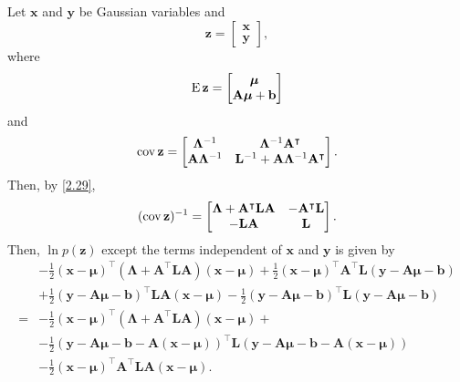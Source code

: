 \subsection{}
\label{2.28}
Let $\mathbf{x}$ and $\mathbf{y}$ be Gaussian variables and
%
\[
\mathbf{z}
= 
\begin{bmatrix}
\mathbf{x} \\
\mathbf{y}
\end{bmatrix}
,
\]
%
where
%
\[
\operatorname{E} \mathbf{z}
= 
\begin{bmatrix}
\bm{\mu} \\
\mathbf{A} 
\bm{\mu} 
+ 
\mathbf{b}
\end{bmatrix}
\]
%
and
%
\[
\operatorname{cov} \mathbf{z}
= 
\begin{bmatrix}
\bm{\Lambda} ^ {- 1} 
& 
\bm{\Lambda} ^ {- 1} 
\mathbf{A} ^ \intercal 
\\
\mathbf{A} 
\bm{\Lambda} ^ {- 1} 
& 
\mathbf{L} ^ {- 1} 
+ 
\mathbf{A} 
\bm{\Lambda} ^ {- 1} 
\mathbf{A} ^ \intercal
\end{bmatrix}
.
\]
Then, by \ref{2.29},
\[
(\operatorname{cov} \mathbf{z}) ^ {- 1}
=
\begin{bmatrix}
\bm{\Lambda} 
+ 
\mathbf{A} ^ \intercal 
\mathbf{L} 
\mathbf{A} 
& 
- \mathbf{A} ^ \intercal \mathbf{L} 
\\
- \mathbf{L} \mathbf{A}
& 
\mathbf{L}
\end{bmatrix}
.
\]
Then, $\ln p(\mathbf{z})$ except the terms independent of $\mathbf{x}$ and $\mathbf{y}$ is given by
%
\begin{equation}
\begin{aligned}
&
-
\frac{1}{2}
(\mathbf{x} - \bm{\mu}) ^ \intercal
\left(
	\bm{\Lambda} 
	+ 
	\mathbf{A} ^ \intercal 
	\mathbf{L} 
	\mathbf{A}
\right)
(\mathbf{x} - \bm{\mu})
+
\frac{1}{2}
(\mathbf{x} - \bm{\mu}) ^ \intercal
\mathbf{A} ^ \intercal
\mathbf{L}
(\mathbf{y} - \mathbf{A} \bm{\mu} - \mathbf{b})
\\
&+
\frac{1}{2}
(\mathbf{y} - \mathbf{A} \bm{\mu} - \mathbf{b}) ^ \intercal
\mathbf{L}
\mathbf{A}
(\mathbf{x} - \bm{\mu})
-
\frac{1}{2}
(\mathbf{y} - \mathbf{A} \bm{\mu} - \mathbf{b}) ^ \intercal
\mathbf{L}
(\mathbf{y} - \mathbf{A} \bm{\mu} - \mathbf{b})
\\
=&
-
\frac{1}{2}
(\mathbf{x} - \bm{\mu}) ^ \intercal
\left(
	\bm{\Lambda} 
	+ 
	\mathbf{A} ^ \intercal 
	\mathbf{L} 
	\mathbf{A}
\right)
(\mathbf{x} - \bm{\mu})
+
\\
&-
\frac{1}{2}
\left(
	\mathbf{y} 
	- 
	\mathbf{A} 
	\bm{\mu} 
	- 
	\mathbf{b} 
	-
	\mathbf{A} (\mathbf{x} -\bm{\mu})
\right) ^ \intercal
\mathbf{L}
\left(
	\mathbf{y} 
	- 
	\mathbf{A} 
	\bm{\mu} 
	- 
	\mathbf{b} 
	-
	\mathbf{A} (\mathbf{x} -\bm{\mu})
\right)
\\
&-
\frac{1}{2}
(\mathbf{x} - \bm{\mu}) ^ \intercal
\mathbf{A} ^ \intercal 
\mathbf{L} 
\mathbf{A}
(\mathbf{x} - \bm{\mu}).
\end{aligned}
\end{equation}
